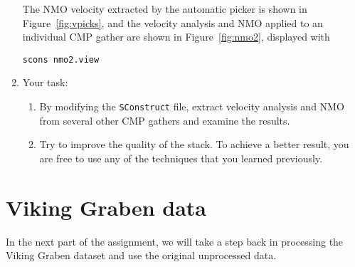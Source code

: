 \begin{enumerate}

The NMO velocity extracted by the automatic picker is shown in
Figure~\ref{fig:vpicks}, and the velocity analysis and NMO applied to
an individual CMP gather are shown in Figure~\ref{fig:nmo2}, displayed with
\begin{verbatim}
scons nmo2.view
\end{verbatim}


\item Your task:
\begin{enumerate}
\item By modifying the \texttt{SConstruct} file, extract velocity analysis and NMO from several other CMP gathers and examine the results.
\item Try to improve the quality of the stack. To achieve a better result, you are free to use any of the techniques that you learned previously.
\end{enumerate}

\end{enumerate}


\lstset{language=python,numbers=left,numberstyle=\tiny,showstringspaces=false}


\section{Viking Graben data}

In the next part of the assignment, we will take a step back in
processing the Viking Graben dataset and use the original unprocessed data. 

